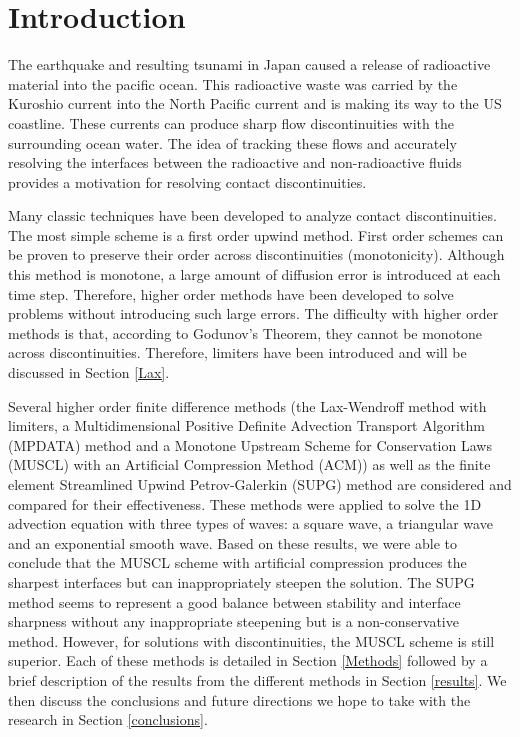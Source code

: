 \section{Introduction}
\label{intro}

The earthquake and resulting tsunami in Japan caused a release of radioactive material into the pacific ocean. This radioactive waste was carried by the Kuroshio current into the North Pacific current and is making its way to the US coastline. These currents can produce sharp flow discontinuities with the surrounding ocean water. The idea of tracking these flows and accurately resolving the  interfaces between the radioactive and non-radioactive fluids provides a motivation for resolving contact discontinuities.

Many classic techniques have been developed to analyze contact discontinuities. The most simple scheme is a first order upwind method. First order schemes can be proven to preserve their order across discontinuities (monotonicity). Although this method is monotone, a large amount of diffusion error is introduced at each time step. Therefore, higher order methods have been developed to solve problems without introducing such large errors. The difficulty with higher order methods is that, according to Godunov's Theorem, they cannot be monotone across discontinuities. Therefore, limiters have been introduced and will be discussed in Section \ref{Lax}.

Several higher order finite difference methods (the Lax-Wendroff method with limiters, a Multidimensional Positive Definite Advection Transport Algorithm (MPDATA) method and a Monotone Upstream Scheme for Conservation Laws (MUSCL) with an Artificial Compression Method (ACM)) as well as the finite element Streamlined Upwind Petrov-Galerkin (SUPG) method are considered and compared for their effectiveness. These methods were applied to solve the 1D advection equation with three types of waves: a square wave, a triangular wave and an exponential smooth wave. Based on these results, we were able to conclude that the MUSCL scheme with artificial compression produces the sharpest interfaces but can inappropriately steepen the solution. The SUPG method seems to represent a good balance between stability and interface sharpness without any inappropriate steepening but is a non-conservative method. However, for solutions with discontinuities, the MUSCL scheme is still superior. Each of these methods is detailed in Section \ref{Methods} followed by a brief description of the results from the different methods in Section \ref{results}. We then discuss the conclusions and future directions we hope to take with the research in Section \ref{conclusions}.


